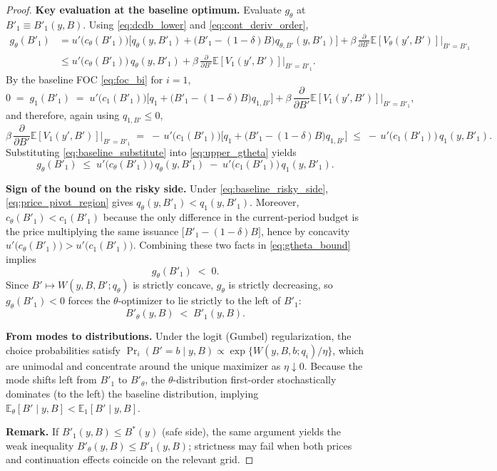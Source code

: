 \documentclass[12pt]{article}
\theoremstyle{plain}
\newcommand{\E}{\mathbb{E}}
\begin{document}
\begin{proof}
	\medskip
	\textbf{Key evaluation at the baseline optimum.}
	Evaluate \(g_\theta\) at \(B'_1\equiv B'_1(y,B)\). Using \eqref{eq:dcdb_lower} and \eqref{eq:cont_deriv_order},
	\begin{align}
		g_\theta(B'_1)
		 & = u'\!\big(c_\theta(B'_1)\big)\Big[q_\theta(y,B'_1)+\big(B'_1-(1-\delta)B\big)q_{\theta,B'}(y,B'_1)\Big]
		+ \beta\,\frac{\partial}{\partial B'}\E[V_\theta(y',B')] \bigg|_{B'=B'_1} \nonumber                         \\
		 & \le u'\!\big(c_\theta(B'_1)\big)\,q_\theta(y,B'_1)
		+ \beta\,\frac{\partial}{\partial B'}\E[V_1(y',B')] \bigg|_{B'=B'_1}.
		\label{eq:upper_gtheta}
	\end{align}
	By the baseline FOC \eqref{eq:foc_bi} for \(i=1\),
	\[
		0 \;=\; g_1(B'_1)
		\;=\; u'\!\big(c_1(B'_1)\big)\Big[q_1+\big(B'_1-(1-\delta)B\big)q_{1,B'}\Big]
		+ \beta\,\frac{\partial}{\partial B'}\E[V_1(y',B')] \bigg|_{B'=B'_1},
	\]
	and therefore, again using \(q_{1,B'}\le 0\),
	\begin{equation}\label{eq:baseline_substitute}
		\beta\,\frac{\partial}{\partial B'}\E[V_1(y',B')] \bigg|_{B'=B'_1}
		\;=\; -\,u'\!\big(c_1(B'_1)\big)\Big[q_1+\big(B'_1-(1-\delta)B\big)q_{1,B'}\Big]
		\;\le\; -\,u'\!\big(c_1(B'_1)\big)\,q_1(y,B'_1).
	\end{equation}
	Substituting \eqref{eq:baseline_substitute} into \eqref{eq:upper_gtheta} yields
	\begin{equation}\label{eq:gtheta_bound}
		g_\theta(B'_1)\;\le\; u'\!\big(c_\theta(B'_1)\big)\,q_\theta(y,B'_1)\;-\;u'\!\big(c_1(B'_1)\big)\,q_1(y,B'_1).
	\end{equation}

	\medskip
	\textbf{Sign of the bound on the risky side.}
	Under \eqref{eq:baseline_risky_side}, \eqref{eq:price_pivot_region} gives \(q_\theta(y,B'_1)<q_1(y,B'_1)\).
	Moreover, \(c_\theta(B'_1)<c_1(B'_1)\) because the only difference in the current-period budget is the price multiplying the same issuance \(\big[B'_1-(1-\delta)B\big]\), hence by concavity \(u'\big(c_\theta(B'_1)\big)>u'\big(c_1(B'_1)\big)\).
	Combining these two facts in \eqref{eq:gtheta_bound} implies
	\[
		g_\theta(B'_1)\;<\;0.
	\]
	Since \(B'\mapsto W(y,B,B';q_\theta)\) is strictly concave, \(g_\theta\) is
	strictly decreasing, so \(g_\theta(B'_1)<0\) forces the \(\theta\)-optimizer to
	lie strictly to the left of \(B'_1\):
	\[
		B'_\theta(y,B)\;<\;B'_1(y,B).
	\]

	\medskip
	\textbf{From modes to distributions.}
	Under the logit (Gumbel) regularization, the choice probabilities satisfy
	\(\Pr_i(B'=b\mid y,B)\propto \exp\{W(y,B,b;q_i)/\eta\}\), which are unimodal and concentrate around the unique maximizer as \(\eta\downarrow 0\).
	Because the mode shifts left from \(B'_1\) to \(B'_\theta\), the \(\theta\)-distribution first-order stochastically dominates (to the left) the baseline distribution, implying
	\(\E_\theta[B'\mid y,B] < \E_1[B'\mid y,B]\).

	\medskip
	\textbf{Remark.} If \(B'_1(y,B)\le B^*(y)\) (safe side), the same argument yields the weak inequality \(B'_\theta(y,B)\le B'_1(y,B)\); strictness may fail when both prices and continuation effects coincide on the relevant grid.
\end{proof}
\end{document}
